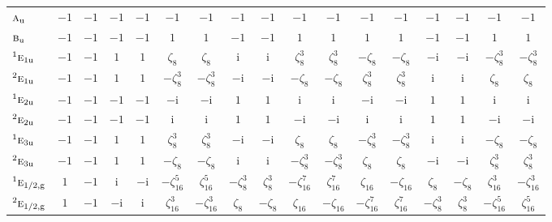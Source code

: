 \documentclass[10pt,a4paper]{article}
\makeatletter
\def\grouprule#1#2{\noalign{\marks\LTgroupmarks{\the\belowrulesep}\nobreak\vskip#1%
  \vskip\aboverulesep}\multispan\LT@cols\unskip{\leaders\hrule\@height#2\hfill\kern\z@}\cr
  \noalign{\penalty\LTrulebreak\vskip\belowrulesep\global\@lastruleclass\z@}}
\numberwithin{equation}{section}
\newcommand{\irr}[1]{\text{\normalfont\scshape #1}}
\newcommand{\conjpair}[1]{{}^{#1}}
\newcommand{\ptag}[1]{\mathrm{#1}}
\newcommand{\iunit}{\mathrm{i}}
\newcommand{\rootunity}[1]{\zeta_{#1}}
\makeatother
\begin{document}
{\begin{longtable}{@{}lcccccccccccccccc@{}}
$\irr{a}_{\ptag{u}}$ & $-1$ & $-1$ & $-1$ & $-1$ & $-1$ & $-1$ & $-1$ & $-1$ & $-1$ & $-1$ & $-1$ & $-1$ & $-1$ & $-1$ & $-1$ & $-1$\\
$\irr{b}_{\ptag{u}}$ & $-1$ & $-1$ & $-1$ & $-1$ & $1$ & $1$ & $-1$ & $-1$ & $1$ & $1$ & $1$ & $1$ & $-1$ & $-1$ & $1$ & $1$\\
$\conjpair{1}\irr{e}_{1\ptag{u}}$ & $-1$ & $-1$ & $1$ & $1$ & $\rootunity{8}$ & $\rootunity{8}$ & $\iunit{}$ & $\iunit{}$ & $\rootunity{8}^{3}$ & $\rootunity{8}^{3}$ & $-\rootunity{8}$ & $-\rootunity{8}$ & $-\iunit{}$ & $-\iunit{}$ & $-\rootunity{8}^{3}$ & $-\rootunity{8}^{3}$\\
$\conjpair{2}\irr{e}_{1\ptag{u}}$ & $-1$ & $-1$ & $1$ & $1$ & $-\rootunity{8}^{3}$ & $-\rootunity{8}^{3}$ & $-\iunit{}$ & $-\iunit{}$ & $-\rootunity{8}$ & $-\rootunity{8}$ & $\rootunity{8}^{3}$ & $\rootunity{8}^{3}$ & $\iunit{}$ & $\iunit{}$ & $\rootunity{8}$ & $\rootunity{8}$\\
$\conjpair{1}\irr{e}_{2\ptag{u}}$ & $-1$ & $-1$ & $-1$ & $-1$ & $-\iunit{}$ & $-\iunit{}$ & $1$ & $1$ & $\iunit{}$ & $\iunit{}$ & $-\iunit{}$ & $-\iunit{}$ & $1$ & $1$ & $\iunit{}$ & $\iunit{}$\\
$\conjpair{2}\irr{e}_{2\ptag{u}}$ & $-1$ & $-1$ & $-1$ & $-1$ & $\iunit{}$ & $\iunit{}$ & $1$ & $1$ & $-\iunit{}$ & $-\iunit{}$ & $\iunit{}$ & $\iunit{}$ & $1$ & $1$ & $-\iunit{}$ & $-\iunit{}$\\
$\conjpair{1}\irr{e}_{3\ptag{u}}$ & $-1$ & $-1$ & $1$ & $1$ & $\rootunity{8}^{3}$ & $\rootunity{8}^{3}$ & $-\iunit{}$ & $-\iunit{}$ & $\rootunity{8}$ & $\rootunity{8}$ & $-\rootunity{8}^{3}$ & $-\rootunity{8}^{3}$ & $\iunit{}$ & $\iunit{}$ & $-\rootunity{8}$ & $-\rootunity{8}$\\
$\conjpair{2}\irr{e}_{3\ptag{u}}$ & $-1$ & $-1$ & $1$ & $1$ & $-\rootunity{8}$ & $-\rootunity{8}$ & $\iunit{}$ & $\iunit{}$ & $-\rootunity{8}^{3}$ & $-\rootunity{8}^{3}$ & $\rootunity{8}$ & $\rootunity{8}$ & $-\iunit{}$ & $-\iunit{}$ & $\rootunity{8}^{3}$ & $\rootunity{8}^{3}$\\
\grouprule{0pt}{\lightrulewidth}
$\conjpair{1}\irr{e}_{1/2,\ptag{g}}$ & $1$ & $-1$ & $\iunit{}$ & $-\iunit{}$ & $-\rootunity{16}^{5}$ & $\rootunity{16}^{5}$ & $-\rootunity{8}^{3}$ & $\rootunity{8}^{3}$ & $-\rootunity{16}^{7}$ & $\rootunity{16}^{7}$ & $\rootunity{16}$ & $-\rootunity{16}$ & $\rootunity{8}$ & $-\rootunity{8}$ & $\rootunity{16}^{3}$ & $-\rootunity{16}^{3}$\\
$\conjpair{2}\irr{e}_{1/2,\ptag{g}}$ & $1$ & $-1$ & $-\iunit{}$ & $\iunit{}$ & $\rootunity{16}^{3}$ & $-\rootunity{16}^{3}$ & $\rootunity{8}$ & $-\rootunity{8}$ & $\rootunity{16}$ & $-\rootunity{16}$ & $-\rootunity{16}^{7}$ & $\rootunity{16}^{7}$ & $-\rootunity{8}^{3}$ & $\rootunity{8}^{3}$ & $-\rootunity{16}^{5}$ & $\rootunity{16}^{5}$\\

\end{longtable}}
\end{document}
